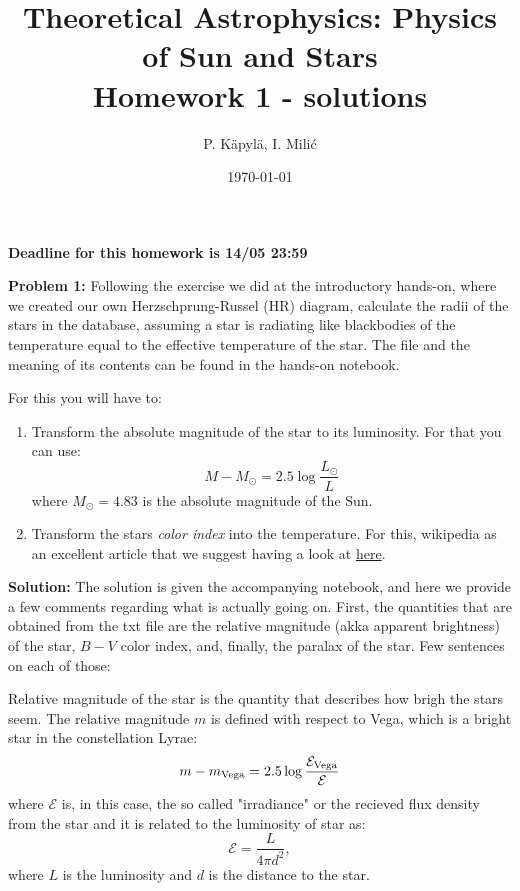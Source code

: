 \documentclass[12pt]{article}
\title{Theoretical Astrophysics: Physics of Sun and Stars\\
Homework 1 - solutions}
\author{P. K\"{a}pyl\"{a}, I. Mili\'{c}}
\date{\today}
\begin{document}
\maketitle

\textbf{Deadline for this homework is 14/05 23:59}



{\bf Problem 1:} Following the exercise we did at the introductory hands-on, where we created our own Herzschprung-Russel (HR) diagram, calculate the radii of the stars in the database, assuming a star is radiating like blackbodies of the temperature equal to the effective temperature of the star. The file and the meaning of its contents can be found in the hands-on notebook.

For this you will have to: 
\begin{enumerate}
  \item Transform the absolute magnitude of the star to its luminosity. For that you can use: 
\begin{equation}
  M - M_{\odot} = 2.5\log \frac{L_{\odot}}{L}
\end{equation}
  where $M_{\odot} = 4.83$ is the absolute magnitude of the Sun. 

  \item Transform the stars \emph{color index} into the temperature. For this, wikipedia as an excellent article that we suggest having a look at \href{https://en.wikipedia.org/wiki/Color_index}{here}.

\end{enumerate}

\textbf{Solution:} The solution is given the accompanying notebook, and here we provide a few comments regarding what is actually going on. First, the quantities that are obtained from the txt file are the relative magnitude (akka apparent brightness) of the star, $B-V$ color index, and, finally, the paralax of the star. Few sentences on each of those: 

Relative magnitude of the star is the quantity that describes how brigh the stars seem. The relative magnitude $m$ is defined with respect to Vega, which is a bright star in the constellation Lyrae:
\begin{equation}
m - m_{\rm Vega} = 2.5 \log \frac{\mathcal{E}_{\rm Vega}}{\mathcal{E}}
\end{equation}
where $\mathcal{E}$ is, in this case, the so called "irradiance" or the recieved flux density from the star and it is related to the luminosity of star as: 
\begin{equation}
\mathcal{E} = \frac{L}{4\pi d^2},
\end{equation}
where $L$ is the luminosity and $d$ is the distance to the star.
\end{document}
